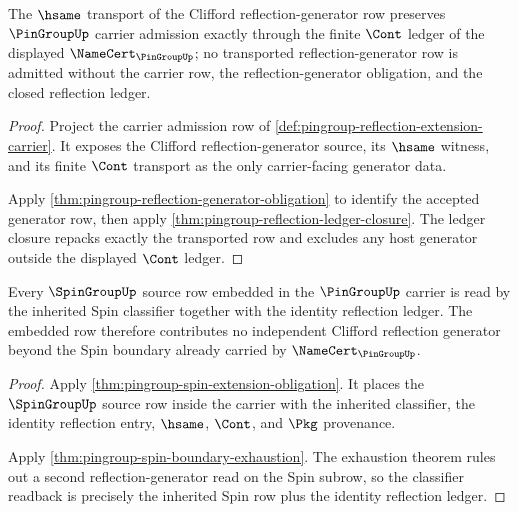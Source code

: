 \begin{theorem}
\label{thm:pingroup-reflection-generator-transport-closure}
The $\hsame$ transport of the Clifford reflection-generator row preserves
$\PinGroupUp$ carrier admission exactly through the finite $\Cont$ ledger of
the displayed $\NameCert_{\PinGroupUp}$; no transported reflection-generator
row is admitted without the carrier row, the reflection-generator obligation,
and the closed reflection ledger.
\end{theorem}
\begin{proof}
Project the carrier admission row of
\autoref{def:pingroup-reflection-extension-carrier}. It exposes the Clifford
reflection-generator source, its $\hsame$ witness, and its finite $\Cont$
transport as the only carrier-facing generator data.

Apply \autoref{thm:pingroup-reflection-generator-obligation} to identify the
accepted generator row, then apply
\autoref{thm:pingroup-reflection-ledger-closure}. The ledger closure repacks
exactly the transported row and excludes any host generator outside the
displayed $\Cont$ ledger.
\end{proof}

\begin{theorem}
\label{thm:pingroup-spin-subrow-classifier-readback}
Every $\SpinGroupUp$ source row embedded in the $\PinGroupUp$ carrier is read
by the inherited Spin classifier together with the identity reflection ledger.
The embedded row therefore contributes no independent Clifford reflection
generator beyond the Spin boundary already carried by $\NameCert_{\PinGroupUp}$.
\end{theorem}
\begin{proof}
Apply \autoref{thm:pingroup-spin-extension-obligation}. It places the
$\SpinGroupUp$ source row inside the carrier with the inherited classifier,
the identity reflection entry, $\hsame$, $\Cont$, and $\Pkg$ provenance.

Apply \autoref{thm:pingroup-spin-boundary-exhaustion}. The exhaustion theorem
rules out a second reflection-generator read on the Spin subrow, so the
classifier readback is precisely the inherited Spin row plus the identity
reflection ledger.
\end{proof}

